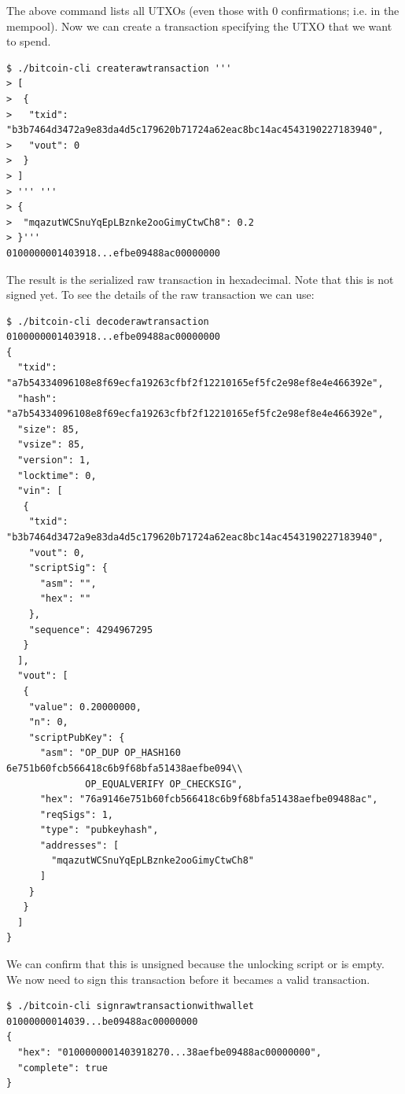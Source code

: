 The above command lists all UTXOs (even those with 0 confirmations; i.e. in the mempool). Now we can create a transaction specifying the UTXO that we want to spend.


\begin{emphbox}
\begin{lstlisting}[style=Bash]
$ ./bitcoin-cli createrawtransaction '''
> [
>  {
>   "txid": "b3b7464d3472a9e83da4d5c179620b71724a62eac8bc14ac4543190227183940",
>   "vout": 0
>  }
> ]
> ''' '''
> {
>  "mqazutWCSnuYqEpLBznke2ooGimyCtwCh8": 0.2
> }'''
0100000001403918...efbe09488ac00000000
\end{lstlisting}
\end{emphbox}


The result is the serialized raw transaction in hexadecimal. Note that this is not signed yet. To see the details of the raw transaction we can use:

\begin{emphbox}
\begin{lstlisting}[style=Bash]
$ ./bitcoin-cli decoderawtransaction 0100000001403918...efbe09488ac00000000
{
  "txid": "a7b54334096108e8f69ecfa19263cfbf2f12210165ef5fc2e98ef8e4e466392e",
  "hash": "a7b54334096108e8f69ecfa19263cfbf2f12210165ef5fc2e98ef8e4e466392e",
  "size": 85,
  "vsize": 85,
  "version": 1,
  "locktime": 0,
  "vin": [
   {
    "txid": "b3b7464d3472a9e83da4d5c179620b71724a62eac8bc14ac4543190227183940",
    "vout": 0,
    "scriptSig": {
      "asm": "",
      "hex": ""
    },
    "sequence": 4294967295
   }
  ],
  "vout": [
   {
    "value": 0.20000000,
    "n": 0,
    "scriptPubKey": {
      "asm": "OP_DUP OP_HASH160 6e751b60fcb566418c6b9f68bfa51438aefbe094\\
              OP_EQUALVERIFY OP_CHECKSIG",
      "hex": "76a9146e751b60fcb566418c6b9f68bfa51438aefbe09488ac",
      "reqSigs": 1,
      "type": "pubkeyhash",
      "addresses": [
        "mqazutWCSnuYqEpLBznke2ooGimyCtwCh8"
      ]
    }
   }
  ]
}
\end{lstlisting}
\end{emphbox}

We can confirm that this is unsigned because the unlocking script or  is empty. We now need to sign this transaction before it becames a valid transaction.

\begin{emphbox}
\begin{lstlisting}[style=Bash]
$ ./bitcoin-cli signrawtransactionwithwallet 01000000014039...be09488ac00000000
{
  "hex": "0100000001403918270...38aefbe09488ac00000000",
  "complete": true
}
\end{lstlisting}
\end{emphbox}


